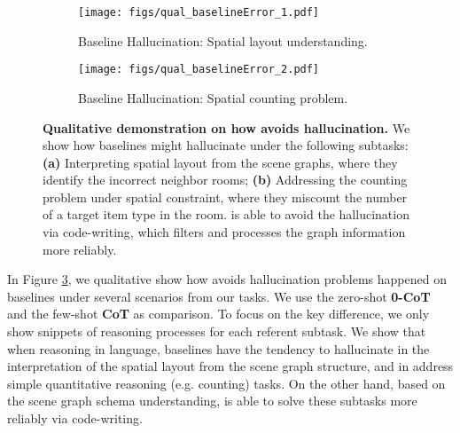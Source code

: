 \begin{figure}[h!]
    \centering
    \begin{subfigure}{\linewidth}
        \centering
        \texttt{[image: figs/qual\_baselineError\_1.pdf]}
        \caption{Baseline Hallucination: Spatial layout understanding.}
        \label{fig:baseHall_Spatial}
    \end{subfigure}

    \vspace{1cm}

    \begin{subfigure}{\linewidth}
        \centering
        \texttt{[image: figs/qual\_baselineError\_2.pdf]}
        \caption{Baseline Hallucination: Spatial counting problem.}
        \label{fig:baseHall_Count}
    \end{subfigure}

    \caption{
    \textbf{Qualitative demonstration on how \RwR avoids hallucination.}
    We show how baselines might hallucinate under the following subtasks:
    \textbf{(a)} Interpreting spatial layout from the scene graphs, where they identify the incorrect neighbor rooms;
    \textbf{(b)} Addressing the counting problem under spatial constraint, where they miscount the number of a target item type in the room.
    \RwR is able to avoid the hallucination via code-writing, which filters and processes the graph information more reliably.
    }
    \label{fig:baseHall}
\end{figure}
In Figure \ref{fig:baseHall}, we qualitative show how \RwR avoids hallucination problems happened on baselines under several scenarios from our tasks. We use the zero-shot \textbf{0-CoT} and the few-shot \textbf{CoT} as comparison. To focus on the key difference, we only show snippets of reasoning processes for each referent subtask.
We show that when reasoning in language, baselines have the tendency to hallucinate in the interpretation of the spatial layout from the scene graph structure, and in address simple quantitative reasoning (e.g. counting) tasks. 
On the other hand, based on the scene graph schema understanding, \RwR is able to solve these subtasks more reliably via code-writing.



